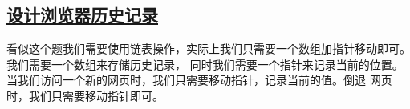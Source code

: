 \documentclass[../../main.tex]{subfiles}
\begin{document}


\subsection{\href{https://leetcode.cn/problems/design-browser-history/}{设计浏览器历史记录}}

看似这个题我们需要使用链表操作，实际上我们只需要一个数组加指针移动即可。我们需要一个数组来存储历史记录，
同时我们需要一个指针来记录当前的位置。当我们访问一个新的网页时，我们只需要移动指针，记录当前的值。倒退
网页时，我们只需要移动指针即可。


\end{document}
